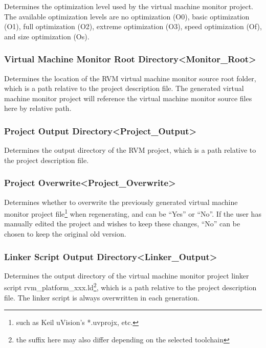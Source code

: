 Determines the optimization level used by the virtual machine monitor project. The available optimization levels are no optimization (O0), basic optimization (O1), full optimization (O2), extreme optimization (O3), speed optimization (Of), and size optimization (Os).

\subsubsection{Virtual Machine Monitor Root Directory<Monitor\_Root>{}}\label{subsubsec:5-3-13-14}

Determines the location of the RVM virtual machine monitor source root folder, which is a path relative to the project description file. The generated virtual machine monitor project will reference the virtual machine monitor source files here by relative path.

\subsubsection{Project Output Directory<Project\_Output>{}}\label{subsubsec:5-3-13-15}

Determines the output directory of the RVM project, which is a path relative to the project description file.

\subsubsection{Project Overwrite<Project\_Overwrite>{}}\label{subsubsec:5-3-13-16}

Determines whether to overwrite the previously generated virtual machine monitor project file\footnote{such as Keil uVision's *.uvprojx, etc.} when regenerating, and can be ``Yes'' or ``No''. If the user has manually edited the project and wishes to keep these changes, ``No'' can be chosen to keep the original old version.

\subsubsection{Linker Script Output Directory<Linker\_Output>{}}\label{subsubsec:5-3-13-17}

Determines the output directory of the virtual machine monitor project linker script rvm\_platform\_xxx.ld\footnote{the suffix here may also differ depending on the selected toolchain}, which is a path relative to the project description file. The linker script is always overwritten in each generation.

